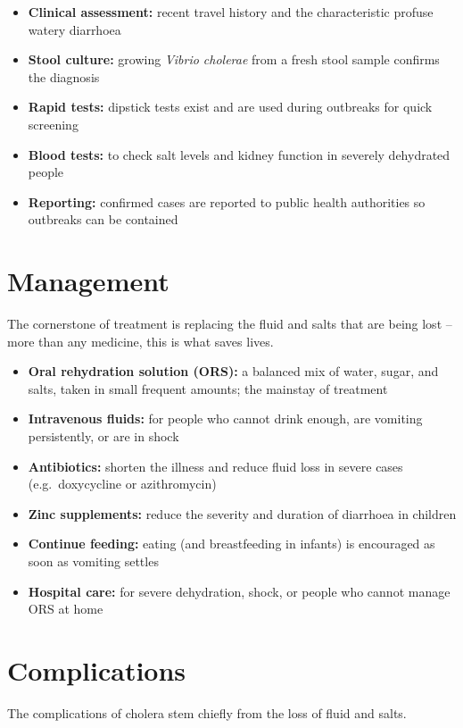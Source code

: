 \begin{itemize}
    \item \textbf{Clinical assessment:} recent travel history and the characteristic profuse watery diarrhoea
    \item \textbf{Stool culture:} growing \textit{Vibrio cholerae} from a fresh stool sample confirms the diagnosis
    \item \textbf{Rapid tests:} dipstick tests exist and are used during outbreaks for quick screening
    \item \textbf{Blood tests:} to check salt levels and kidney function in severely dehydrated people
    \item \textbf{Reporting:} confirmed cases are reported to public health authorities so outbreaks can be contained
\end{itemize}

\section*{Management}
The cornerstone of treatment is replacing the fluid and salts that are being lost -- more than any medicine, this is what saves lives.

\begin{itemize}
    \item \textbf{Oral rehydration solution (ORS):} a balanced mix of water, sugar, and salts, taken in small frequent amounts; the mainstay of treatment
    \item \textbf{Intravenous fluids:} for people who cannot drink enough, are vomiting persistently, or are in shock
    \item \textbf{Antibiotics:} shorten the illness and reduce fluid loss in severe cases (e.g.\ doxycycline or azithromycin)
    \item \textbf{Zinc supplements:} reduce the severity and duration of diarrhoea in children
    \item \textbf{Continue feeding:} eating (and breastfeeding in infants) is encouraged as soon as vomiting settles
    \item \textbf{Hospital care:} for severe dehydration, shock, or people who cannot manage ORS at home
\end{itemize}

\section*{Complications}
The complications of cholera stem chiefly from the loss of fluid and salts.

